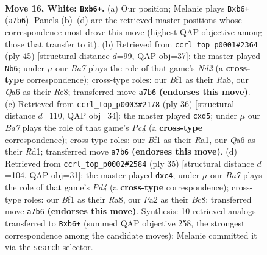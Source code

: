 \documentclass[11pt]{article}
\begin{document}
\clearpage

\begin{figure}[p]\centering
\begin{subfigure}{0.46\textwidth}\centering
\resizebox{\linewidth}{!}{%
\newchessgame
\chessboard[
  setfen={k2r3r/B1p1bppp/Qpbpqn2/8/1P2P1P1/2N2P2/P1P4P/2KR1B1R w - - 3 16},
  showmover=false,
  pgfstyle=straightmove, color=movearrow, markmove={a7-b6}
]}
\caption{}
\end{subfigure}\hfill
\begin{subfigure}{0.46\textwidth}\centering
\resizebox{\linewidth}{!}{%
\newchessgame
\chessboard[
  setfen={r3rbk1/ppqn2pp/2p2p2/3pP3/1P3P2/P1NQ4/2P3PP/2BRR2K b - - 2 23},
  showmover=false,
  pgfstyle=straightmove, color=movearrow, markmove={d7-b6}
]}
\caption{}
\end{subfigure}
\\[4pt]
\begin{subfigure}{0.46\textwidth}\centering
\resizebox{\linewidth}{!}{%
\newchessgame
\chessboard[
  setfen={rn1r2k1/1bq2pp1/1p2p2p/3pP3/p1P1n3/B3QNP1/P4PBP/R2R2K1 w - - 2 19},
  showmover=false,
  pgfstyle=straightmove, color=movearrow, markmove={c4-d5}
]}
\caption{}
\end{subfigure}\hfill
\begin{subfigure}{0.46\textwidth}\centering
\resizebox{\linewidth}{!}{%
\newchessgame
\chessboard[
  setfen={r1br2k1/2q1bp1p/p4np1/3p4/2P2P2/2NB2Q1/PBP3PP/4RR1K b - - 0 18},
  showmover=false,
  pgfstyle=straightmove, color=movearrow, markmove={d5-c4}
]}
\caption{}
\end{subfigure}
\caption{\textbf{Move 16, White: \texttt{Bxb6+}.} (a) Our position; Melanie plays \texttt{Bxb6+} (\texttt{a7b6}). Panels (b)--(d) are the retrieved master positions whose correspondence most drove this move (highest QAP objective among those that transfer to it). (b) Retrieved from \texttt{ccrl\_top\_p0001\#2364} (ply 45) [structural distance $d$=99, QAP obj=37]: the master played \texttt{Nb6}; under $\mu$ our \emph{Ba7} plays the role of that game's \emph{Nd2} (a \textbf{cross-type} correspondence); cross-type roles: our \emph{B}f1 as their \emph{R}a8, our \emph{Q}a6 as their \emph{R}e8; transferred move \texttt{a7b6} \textbf{(endorses this move)}. (c) Retrieved from \texttt{ccrl\_top\_p0003\#2178} (ply 36) [structural distance $d$=110, QAP obj=34]: the master played \texttt{cxd5}; under $\mu$ our \emph{Ba7} plays the role of that game's \emph{Pc4} (a \textbf{cross-type} correspondence); cross-type roles: our \emph{B}f1 as their \emph{R}a1, our \emph{Q}a6 as their \emph{R}d1; transferred move \texttt{a7b6} \textbf{(endorses this move)}. (d) Retrieved from \texttt{ccrl\_top\_p0002\#2584} (ply 35) [structural distance $d$=104, QAP obj=31]: the master played \texttt{dxc4}; under $\mu$ our \emph{Ba7} plays the role of that game's \emph{Pd4} (a \textbf{cross-type} correspondence); cross-type roles: our \emph{B}f1 as their \emph{R}a8, our \emph{P}a2 as their \emph{B}c8; transferred move \texttt{a7b6} \textbf{(endorses this move)}. Synthesis: 10 retrieved analogs transferred to \texttt{Bxb6+} (summed QAP objective 258, the strongest correspondence among the candidate moves); Melanie committed it via the \texttt{search} selector.}
\label{fig:thought-m30}
\end{figure}
\end{document}
